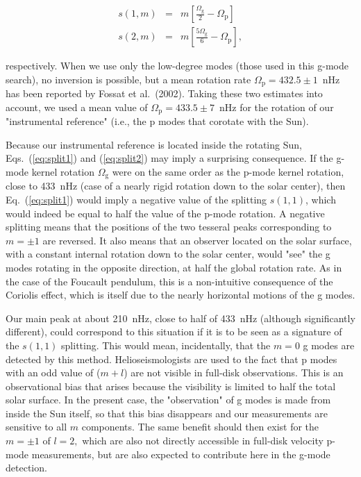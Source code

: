 \documentclass[bibyear]{aa}
\begin{document}
\begin{eqnarray}
s(1,m)&=&m[\frac{\Omega_\mathrm{g}}{2} -\Omega_\mathrm{p}]\label{eq:split1}\\
s(2,m)&=&m[\frac{5\Omega_\mathrm{g}}{6} -\Omega_\mathrm{p}]\label{eq:split2},
\end{eqnarray}

respectively. When we use only the low-degree modes (those used in this g-mode search), no inversion is possible, but a mean rotation rate $\Omega_\mathrm{p}=432.5\pm1$~nHz has been reported by Fossat et al.~(2002). Taking these two estimates into account, we used a mean value of $\Omega_\mathrm{p}=433.5\pm7$~nHz for the rotation of our "instrumental reference" (i.e., the p modes that corotate with the Sun).


Because our instrumental reference is located inside the rotating Sun, Eqs.~(\ref{eq:split1}) and (\ref{eq:split2}) may imply a surprising consequence. If the g-mode kernel rotation  $\Omega_\mathrm{g}$  were on the same order as the p-mode kernel rotation, close to 433~nHz (case of a nearly rigid rotation down to the solar center), then Eq.~(\ref{eq:split1}) would imply a negative value of the splitting $s(1,1)$, which would indeed be equal to half the value of the p-mode rotation. A negative splitting means that the positions of the two tesseral peaks corresponding to $m=\pm 1$ are reversed. It also means that an observer located on the solar surface, with a constant internal rotation down to the solar center, would "see" the g modes rotating in the opposite direction, at half the global rotation rate. As in the case of the Foucault pendulum, this is a non-intuitive consequence of the Coriolis effect, which is itself due to the nearly horizontal motions of the g modes.


Our main peak at about 210~nHz, close  to half of 433~nHz (although significantly different), could correspond to this situation if it is to be seen as a signature of the $s(1,1)$ splitting. This would mean, incidentally, that the $m=0$ g modes are detected by this method. 
Helioseismologists are used to the fact that p modes with an odd value of ($m+l$) are not visible in full-disk observations. This is an observational bias that arises because the visibility is limited to half the total solar surface. In the present case, the "observation" of g modes is made from inside the Sun itself, so that this bias disappears and our measurements are sensitive to all $m$ components.
The same benefit should then exist for the $m=\pm 1$ of $l=2,$ which are also not directly accessible in full-disk velocity p-mode measurements, but are also expected to contribute here in the g-mode detection. 
\end{document}
